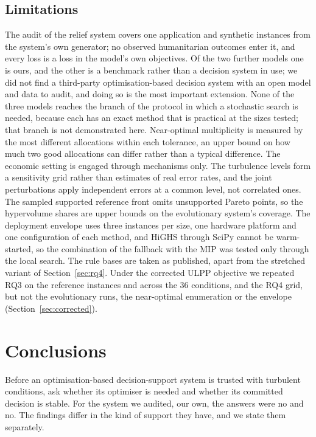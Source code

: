 \documentclass[systems,article,submit,moreauthors,pdftex]{Definitions/mdpi}
\begin{document}
\subsection{Limitations}
The audit of the relief system covers one application and synthetic instances from the system's
own generator; no observed humanitarian outcomes enter it, and every loss is a loss in the model's
own objectives. Of the two further models one is ours, and the other is a benchmark rather than a
decision system in use; we did not find a third-party optimisation-based decision system with an
open model and data to audit, and doing so is the most important extension. None of the three
models reaches the branch of the protocol in which a stochastic search is needed, because each
has an exact method that is practical at the sizes tested; that branch is not demonstrated
here. Near-optimal multiplicity is measured by the most different allocations within each
tolerance, an upper bound on how much two good allocations can differ rather than a typical
difference. The economic setting
is engaged through mechanisms only. The turbulence levels form a sensitivity grid rather than
estimates of real error rates, and the joint perturbations apply independent errors at a common
level, not correlated ones. The sampled supported reference front omits unsupported Pareto points,
so the hypervolume shares are upper bounds on the evolutionary system's coverage. The deployment
envelope uses three instances per size, one hardware platform and one configuration of each
method, and HiGHS through SciPy cannot be warm-started, so the combination of the fallback with
the MIP was tested only through the local search. The rule bases are taken as published, apart
from the stretched variant of Section~\ref{sec:rq4}. Under the corrected ULPP objective we
repeated RQ3 on the reference instances and across the $36$ conditions, and the RQ4 grid, but
not the evolutionary runs, the near-optimal enumeration or the envelope
(Section~\ref{sec:corrected}).

\section{Conclusions}\label{sec:conclusion}
Before an optimisation-based decision-support system is trusted with turbulent conditions, ask
whether its optimiser is needed and whether its committed decision is stable. For the system we
audited, our own, the answers were no and no. The findings differ in the kind of support they
have, and we state them separately.
\end{document}
